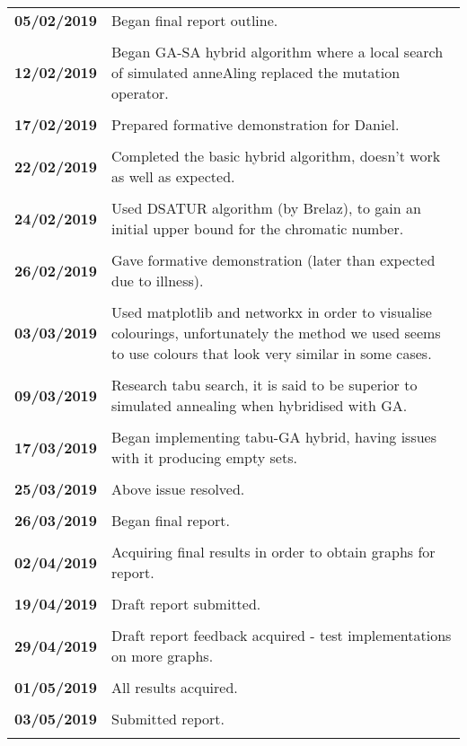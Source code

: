 \documentclass[12pt,a4paper]{article}
\begin{document}
\begin{longtable}{ p{} | p{} }
\textbf{05/02/2019} & Began final report outline. \\ \\
\textbf{12/02/2019} & Began GA-SA hybrid algorithm where a local search of simulated anneAling replaced the mutation operator. \\ \\
\textbf{17/02/2019} & Prepared formative demonstration for Daniel. \\ \\
\textbf{22/02/2019} & Completed the basic hybrid algorithm, doesn't work as well as expected. \\ \\
\textbf{24/02/2019} & Used DSATUR algorithm (by Brelaz), to gain an initial upper bound for the chromatic number. \\ \\
\textbf{26/02/2019} & Gave formative demonstration (later than expected due to illness). \\ \\
\textbf{03/03/2019} & Used matplotlib and networkx in order to visualise colourings, unfortunately the method we used seems to use colours that look very similar in some cases.  \\ \\
\textbf{09/03/2019} & Research tabu search, it is said to be superior to simulated annealing when hybridised with GA. \\ \\
\textbf{17/03/2019} & Began implementing tabu-GA hybrid, having issues with it producing empty sets. \\ \\
\textbf{25/03/2019} & Above issue resolved. \\ \\
\textbf{26/03/2019} & Began final report. \\ \\
\textbf{02/04/2019} & Acquiring final results in order to obtain graphs for report. \\ \\
\textbf{19/04/2019} & Draft report submitted. \\ \\
\textbf{29/04/2019} & Draft report feedback acquired - test implementations on more graphs. \\ \\
\textbf{01/05/2019} & All results acquired. \\ \\
\textbf{03/05/2019} & Submitted report. \\ \\
\hline
\bottomrule
\end{longtable}
\end{document}
